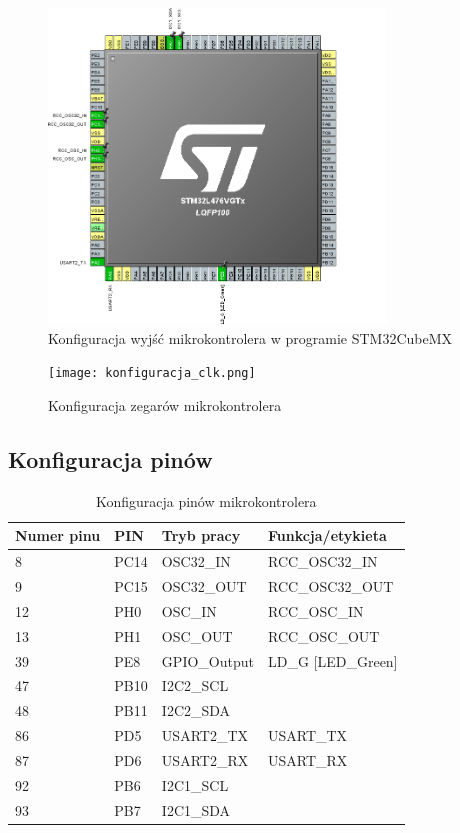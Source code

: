 \documentclass[10pt, a4paper]{article}
\begin{document}
\begin{figure}[H]
	\centering
	\includegraphics[width=0.8\textwidth]{konfiguracja_mcu.png}
	\caption{Konfiguracja wyjść mikrokontrolera w programie STM32CubeMX}
	\label{fig:KonfiguracjaMikrokontrolera}
\end{figure}

\newpage
\begin{figure}[H]
	\centering
	\texttt{[image: konfiguracja\_clk.png]}
	\caption{Konfiguracja zegarów mikrokontrolera}
	\label{fig:KonfiguracjaZegara}
\end{figure}

\subsection{Konfiguracja pinów}

\begin{table}[H]
	\centering
	\begin{tabular}{|l|l|l|l|}
		\hline
		Numer pinu	&	PIN & Tryb pracy & Funkcja/etykieta\\
		\hline
		8&	PC14 & OSC32\_IN &	RCC\_OSC32\_IN	\\
		9&	PC15 & OSC32\_OUT &	RCC\_OSC32\_OUT	\\
		12&	PH0 & OSC\_IN &	RCC\_OSC\_IN	\\
		13&	PH1 & OSC\_OUT &	RCC\_OSC\_OUT	\\
		39&	PE8 &	GPIO\_Output&	LD\_G [LED\_Green] \\
		47&	PB10 &	I2C2\_SCL&	\\
		48&	PB11 &	I2C2\_SDA&	\\
		86&	PD5 &	USART2\_TX&	USART\_TX\\
		87&	PD6 &	USART2\_RX&	USART\_RX\\
		92&	PB6 &	I2C1\_SCL&	\\
		93&	PB7 &	I2C1\_SDA&	\\
		\hline
	\end{tabular}
	\caption{Konfiguracja pinów mikrokontrolera}
	\label{tab:KonfiguracjaPinów}	
\end{table}
\end{document}
